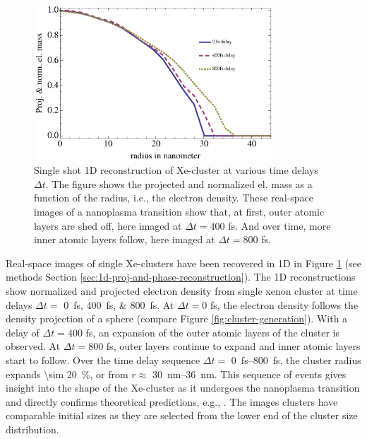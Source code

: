 \begin{figure}
	\centering
		\includegraphics[width=0.80\textwidth]{images/results/Xe-reconstructions.eps}
	\caption[Single-shot 1D reconstruction of \SI{\sim 30}{\nano\meter} radius Xe-cluster]{Single shot 1D reconstruction of Xe-cluster at various time delays $\Delta t$. The figure shows the projected and normalized el. mass as a function of the radius, i.e., the electron density. These real-space images of a nanoplasma transition show that, at first, outer atomic layers are shed off, here imaged at $\Delta t=400$ fs. And over time, more inner atomic layers follow, here imaged at $\Delta t= 800$ fs.}
	\label{fig:Xe-reconstructions}
\end{figure}
Real-space images of single Xe-clusters have been recovered in 1D in Figure \ref{fig:Xe-reconstructions} (see methods Section \ref{sec:1d-proj-and-phase-reconstruction}). The 1D reconstructions show normalized and projected electron density from single xenon cluster at time delays $\Delta t=$ \SIlist{0;400;800}{\femto\second}. At $\Delta t = 0$ fs, the electron density follows the density projection of a sphere (compare Figure \ref{fig:cluster-generation}). With a delay of $\Delta t = 400$ fs, an expansion of the outer atomic layers of the cluster is observed. At $\Delta t = 800$ fs, outer layers continue to expand and inner atomic layers start to follow. Over the time delay sequence $\Delta t=$ \SIrange{0}{800}{\femto\second}, the cluster radius expands \SI{\sim 20}{\percent}, or from $r\approx $ \SIrange{30}{36}{\nano\meter}. This sequence of events gives insight into the shape of the Xe-cluster as it undergoes the nanoplasma transition and directly confirms theoretical predictions, e.g., \citep{Hau-Riege-2004-PRE}. The images clusters have comparable initial sizes as they are selected from the lower end of the cluster size distribution.\\[1\baselineskip]

